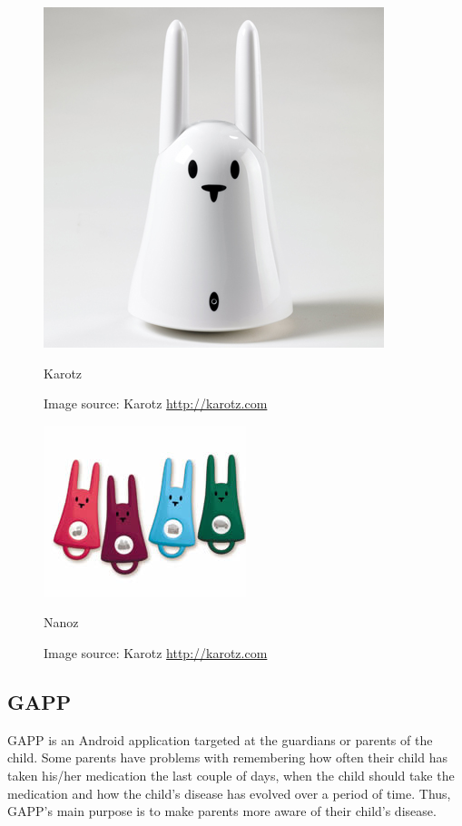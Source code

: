 \begin{figure}[H]
	\begin{minipage}[b]{0.4\linewidth}
		\centering
			\includegraphics[width=0.20\paperwidth]{Pictures/karotz.jpg}
		\caption{Karotz}
		\caption*{Image source: Karotz \url{http://karotz.com}}
		\label{fig:karotz}
	\end{minipage}
	\hspace{3cm}
		\begin{minipage}[b]{0.4\linewidth}
		\centering
			\includegraphics[width=0.20\paperwidth]{Pictures/app-screenshots/nanoz.png}
		\caption{Nanoz}
		\caption*{Image source: Karotz \url{http://karotz.com}}
		\label{fig:karotz}
	\end{minipage}
\end{figure}


\subsection{GAPP}
\label{sec:description-gapp}
GAPP is an Android application targeted at the guardians or parents of the child. 
Some parents have problems with remembering how often their child has taken his/her medication the last couple of days, when the child should take the medication and how the child's disease has evolved over a period of time. Thus, GAPP's main purpose is to make parents more aware of their child's disease.   


